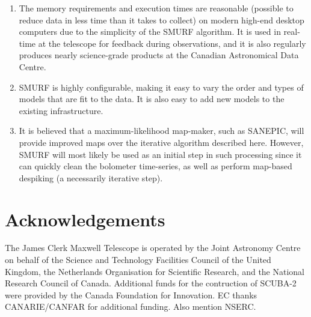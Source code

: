 \documentclass[useAMS,usenatbib,nofootinbib]{mn2e}
\newcommand{\scuba}{SCUBA-2}
\begin{document}
\begin{enumerate}
\item The memory requirements and execution times are reasonable
(possible to reduce data in less time than it takes to collect) on
modern high-end desktop computers due to the simplicity of the SMURF
algorithm. It is used in real-time at the telescope for feedback
during observations, and it is also regularly produces nearly
science-grade products at the Canadian Astronomical Data Centre.

\item SMURF is highly configurable, making it easy to vary the order
and types of models that are fit to the data. It is also easy to add
new models to the existing infrastructure.

\item It is believed that a maximum-likelihood map-maker, such as
SANEPIC, will provide improved maps over the iterative algorithm
described here. However, SMURF will most likely be used as an initial
step in such processing since it can quickly clean the bolometer
time-series, as well as perform map-based despiking (a necessarily
iterative step).

\end{enumerate}




\section{Acknowledgements}

The James Clerk Maxwell Telescope is operated by the Joint Astronomy
Centre on behalf of the Science and Technology Facilities Council of
the United Kingdom, the Netherlands Organisation for Scientific
Research, and the National Research Council of Canada. Additional
funds for the contruction of SCUBA-2 were provided by the Canada
Foundation for Innovation. EC thanks CANARIE/CANFAR for additional
funding. Also mention NSERC.



\end{document}
